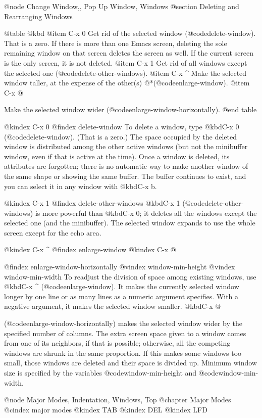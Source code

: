 {{{{{{{{{{{{{{{{{{{{@node Change Window,, Pop Up Window, Windows
@section Deleting and Rearranging Windows

@table @kbd
@item C-x 0
Get rid of the selected window (@code{delete-window}).  That is a zero. 
If there is more than one Emacs screen, deleting the sole remaining
window on that screen deletes the screen as well. If the current screen
is the only screen, it is not deleted. 
@item C-x 1
Get rid of all windows except the selected one
(@code{delete-other-windows}).
@item C-x ^
Make the selected window taller, at the expense of the other(s)
@*(@code{enlarge-window}).
@item C-x @}
Make the selected window wider (@code{enlarge-window-horizontally}).
@end table

@kindex C-x 0
@findex delete-window
  To delete a window, type @kbd{C-x 0} (@code{delete-window}).  (That is a
zero.)  The space occupied by the deleted window is distributed among the
other active windows (but not the minibuffer window, even if that is active
at the time).  Once a window is deleted, its attributes are forgotten;
there is no automatic way to make another window of the same shape or
showing the same buffer.  The buffer continues to exist, and you can
select it in any window with @kbd{C-x b}.

@kindex C-x 1
@findex delete-other-windows
  @kbd{C-x 1} (@code{delete-other-windows}) is more powerful than @kbd{C-x 0};
it deletes all the windows except the selected one (and the minibuffer).
The selected window expands to use the whole screen except for the echo
area.

@kindex C-x ^
@findex enlarge-window
@kindex C-x @}
@findex enlarge-window-horizontally
@vindex window-min-height
@vindex window-min-width
  To readjust the division of space among existing windows, use @kbd{C-x
^} (@code{enlarge-window}).  It makes the currently selected window
longer by one line or as many lines as a numeric argument specifies.
With a negative argument, it makes the selected window smaller.
@kbd{C-x @}} (@code{enlarge-window-horizontally}) makes the selected
window wider by the specified number of columns.  The extra screen space
given to a window comes from one of its neighbors, if that is possible;
otherwise, all the competing windows are shrunk in the same proportion.
If this makes some windows too small, those windows are deleted and their
space is divided up.   Minimum window size is specified by the variables
@code{window-min-height} and @code{window-min-width}.

@node Major Modes, Indentation, Windows, Top
@chapter Major Modes
@cindex major modes
@kindex TAB
@kindex DEL
@kindex LFD

}}}}}}}}}}}}}}}}}
